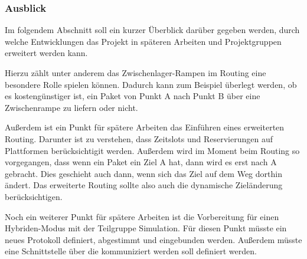 \subsubsection{Ausblick}
Im folgendem Abschnitt soll ein kurzer Überblick darüber gegeben werden, durch welche Entwicklungen das Projekt in späteren Arbeiten und Projektgruppen erweitert werden kann. 

Hierzu zählt unter anderem das Zwischenlager-Rampen im Routing eine besondere Rolle spielen können. Dadurch kann zum Beispiel überlegt werden, ob es kostengünstiger ist, ein Paket von Punkt A nach Punkt B über eine Zwischenrampe zu liefern oder nicht.

Außerdem ist ein Punkt für spätere Arbeiten das Einführen eines erweiterten Routing. Darunter ist zu verstehen, dass Zeitslots und Reservierungen auf Plattformen berücksichtigit werden. Außerdem wird im Moment beim Routing so vorgegangen, dass wenn ein Paket ein Ziel A hat, dann wird es erst nach A gebracht. Dies geschieht auch dann, wenn sich das Ziel auf dem Weg dorthin ändert. Das erweiterte Routing sollte also auch die dynamische Zieländerung berücksichtigen.

Noch ein weiterer Punkt für spätere Arbeiten ist die Vorbereitung für einen Hybriden-Modus mit der Teilgruppe Simulation. Für diesen Punkt müsste ein neues Protokoll definiert, abgestimmt und eingebunden werden. Außerdem müsste eine Schnittstelle über die kommuniziert werden soll definiert werden.
